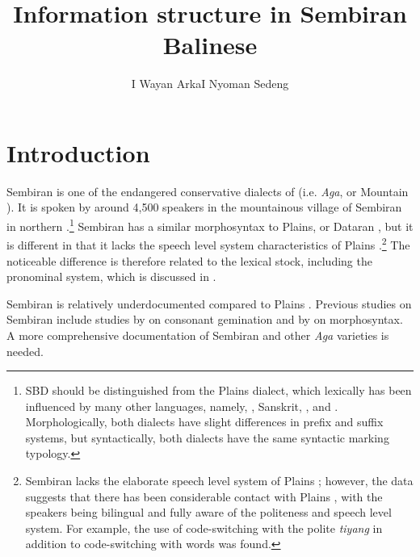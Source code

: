 \documentclass[output=paper
,modfonts
,nonflat]{langsci/langscibook}
\title{Information structure in Sembiran Balinese}
\author{I Wayan Arka\affiliation{Australian National University / Universitas Udayana}\lastand I Nyoman Sedeng\affiliation{Universitas Udayana}}
\begin{document}
\maketitle

\section{\label{s:arka:1}Introduction}
\largerpage
Sembiran  is one of the endangered conservative dialects of  (i.e. \textit{ Aga}, or Mountain ). It is spoken by around 4,500 speakers in the mountainous village of Sembiran in northern .\footnote{SBD should be distinguished from the Plains  dialect, which lexically has been influenced by many other languages, namely, , Sanskrit, ,  and . Morphologically, both dialects have slight differences in prefix and suffix systems, but syntactically, both dialects have the same syntactic marking typology.}  Sembiran  has a similar morphosyntax to Plains, or Dataran , but it is different in that it lacks the speech level system characteristics of Plains .\footnote{Sembiran  lacks the elaborate speech level system of Plains ; however, the data suggests that there has been considerable contact with Plains , with the speakers being bilingual and fully aware of the politeness and speech level system. For example, the use of code-switching with the polite  \textit{tiyang} in addition to code-switching with  words was found.} The noticeable difference is therefore related to the lexical stock, including the pronominal system, which is discussed in . 

Sembiran  is relatively underdocumented compared to Plains . Previous studies on Sembiran  include studies by \citet{Astini1996} on consonant gemination and by \citet{Sedeng2007} on morphosyntax. A more comprehensive documentation of Sembiran  and other \textit{ Aga} varieties is needed. 
\end{document}
